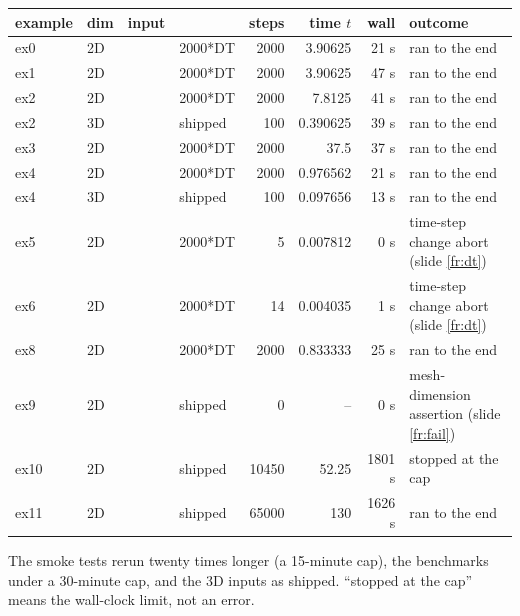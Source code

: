 \setlength{\tabcolsep}{3pt}
\begin{tabular}{@{}l l l l r r r L{0.3\textwidth}@{}}
\toprule
example & dim & input &  & steps & time $t$ & wall & outcome \\
\midrule
ex0 & 2D &  & 2000*DT & 2000 & 3.90625 & 21 s & ran to the end \\
ex1 & 2D &  & 2000*DT & 2000 & 3.90625 & 47 s & ran to the end \\
ex2 & 2D &  & 2000*DT & 2000 & 7.8125 & 41 s & ran to the end \\
ex2 & 3D &  & shipped & 100 & 0.390625 & 39 s & ran to the end \\
ex3 & 2D &  & 2000*DT & 2000 & 37.5 & 37 s & ran to the end \\
ex4 & 2D &  & 2000*DT & 2000 & 0.976562 & 21 s & ran to the end \\
ex4 & 3D &  & shipped & 100 & 0.097656 & 13 s & ran to the end \\
ex5 & 2D &  & 2000*DT & 5 & 0.007812 & 0 s & time-step change abort (slide \ref{fr:dt}) \\
ex6 & 2D &  & 2000*DT & 14 & 0.004035 & 1 s & time-step change abort (slide \ref{fr:dt}) \\
ex8 & 2D &  & 2000*DT & 2000 & 0.833333 & 25 s & ran to the end \\
ex9 & 2D &  & shipped & 0 & -- & 0 s & mesh-dimension assertion (slide \ref{fr:fail}) \\
ex10 & 2D &  & shipped & 10450 & 52.25 & 1801 s & stopped at the cap \\
ex11 & 2D &  & shipped & 65000 & 130 & 1626 s & ran to the end \\
\bottomrule
\end{tabular}

\medskip
\scriptsize The smoke tests rerun twenty times longer (a 15-minute cap), the benchmarks under a 30-minute cap, and the 3D inputs as shipped. ``stopped at the cap'' means the wall-clock limit, not an error.
